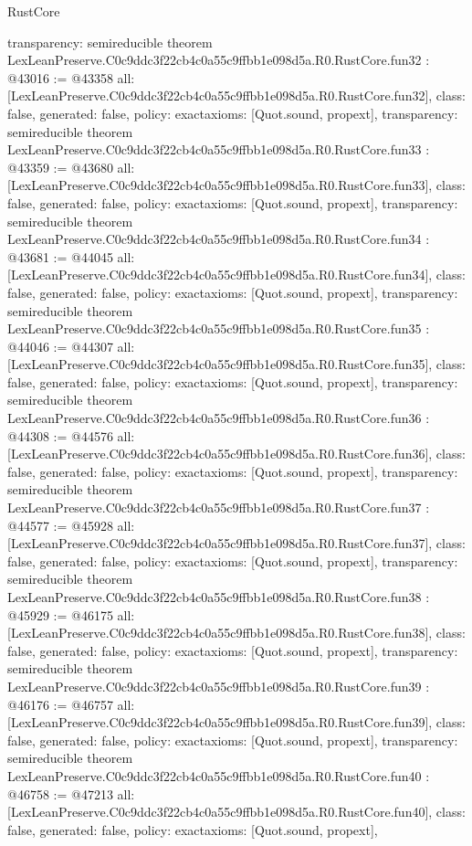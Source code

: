 \begin{lexlean}{RustCore}
\begin{coremodule}
{  transparency: semireducible
}
theorem LexLeanPreserve.C0c9ddc3f22cb4c0a55c9ffbb1e098d5a.R0.RustCore.fun32 : @43016 := @43358 {
  all: [LexLeanPreserve.C0c9ddc3f22cb4c0a55c9ffbb1e098d5a.R0.RustCore.fun32],
  class: false,
  generated: false,
  policy: exact{axioms: [Quot.sound, propext]},
  transparency: semireducible
}
theorem LexLeanPreserve.C0c9ddc3f22cb4c0a55c9ffbb1e098d5a.R0.RustCore.fun33 : @43359 := @43680 {
  all: [LexLeanPreserve.C0c9ddc3f22cb4c0a55c9ffbb1e098d5a.R0.RustCore.fun33],
  class: false,
  generated: false,
  policy: exact{axioms: [Quot.sound, propext]},
  transparency: semireducible
}
theorem LexLeanPreserve.C0c9ddc3f22cb4c0a55c9ffbb1e098d5a.R0.RustCore.fun34 : @43681 := @44045 {
  all: [LexLeanPreserve.C0c9ddc3f22cb4c0a55c9ffbb1e098d5a.R0.RustCore.fun34],
  class: false,
  generated: false,
  policy: exact{axioms: [Quot.sound, propext]},
  transparency: semireducible
}
theorem LexLeanPreserve.C0c9ddc3f22cb4c0a55c9ffbb1e098d5a.R0.RustCore.fun35 : @44046 := @44307 {
  all: [LexLeanPreserve.C0c9ddc3f22cb4c0a55c9ffbb1e098d5a.R0.RustCore.fun35],
  class: false,
  generated: false,
  policy: exact{axioms: [Quot.sound, propext]},
  transparency: semireducible
}
theorem LexLeanPreserve.C0c9ddc3f22cb4c0a55c9ffbb1e098d5a.R0.RustCore.fun36 : @44308 := @44576 {
  all: [LexLeanPreserve.C0c9ddc3f22cb4c0a55c9ffbb1e098d5a.R0.RustCore.fun36],
  class: false,
  generated: false,
  policy: exact{axioms: [Quot.sound, propext]},
  transparency: semireducible
}
theorem LexLeanPreserve.C0c9ddc3f22cb4c0a55c9ffbb1e098d5a.R0.RustCore.fun37 : @44577 := @45928 {
  all: [LexLeanPreserve.C0c9ddc3f22cb4c0a55c9ffbb1e098d5a.R0.RustCore.fun37],
  class: false,
  generated: false,
  policy: exact{axioms: [Quot.sound, propext]},
  transparency: semireducible
}
theorem LexLeanPreserve.C0c9ddc3f22cb4c0a55c9ffbb1e098d5a.R0.RustCore.fun38 : @45929 := @46175 {
  all: [LexLeanPreserve.C0c9ddc3f22cb4c0a55c9ffbb1e098d5a.R0.RustCore.fun38],
  class: false,
  generated: false,
  policy: exact{axioms: [Quot.sound, propext]},
  transparency: semireducible
}
theorem LexLeanPreserve.C0c9ddc3f22cb4c0a55c9ffbb1e098d5a.R0.RustCore.fun39 : @46176 := @46757 {
  all: [LexLeanPreserve.C0c9ddc3f22cb4c0a55c9ffbb1e098d5a.R0.RustCore.fun39],
  class: false,
  generated: false,
  policy: exact{axioms: [Quot.sound, propext]},
  transparency: semireducible
}
theorem LexLeanPreserve.C0c9ddc3f22cb4c0a55c9ffbb1e098d5a.R0.RustCore.fun40 : @46758 := @47213 {
  all: [LexLeanPreserve.C0c9ddc3f22cb4c0a55c9ffbb1e098d5a.R0.RustCore.fun40],
  class: false,
  generated: false,
  policy: exact{axioms: [Quot.sound, propext]},
}
\end{coremodule}
\end{lexlean}
